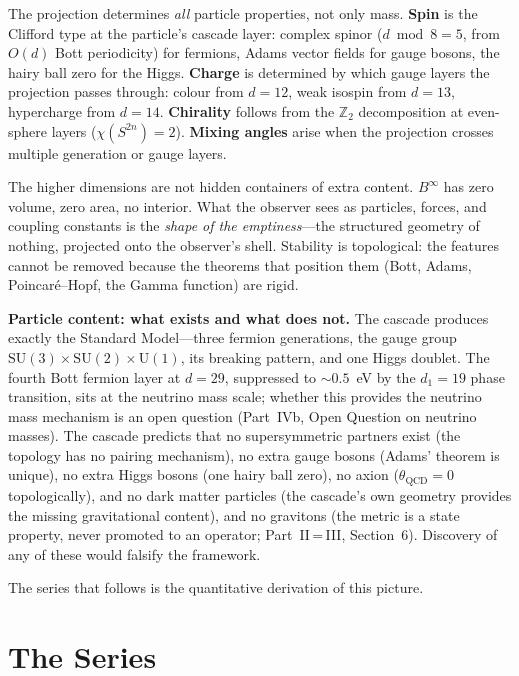 \documentclass[12pt,a4paper]{article}
\begin{document}
The projection determines \emph{all} particle properties, not only mass.
\textbf{Spin} is the Clifford type at the particle's cascade layer: complex
spinor ($d\bmod 8=5$, from $O(d)$ Bott periodicity) for fermions, Adams vector fields for gauge
bosons, the hairy ball zero for the Higgs. \textbf{Charge} is determined by
which gauge layers the projection passes through: colour from $d=12$, weak
isospin from $d=13$, hypercharge from $d=14$. \textbf{Chirality} follows from
the $\mathbb{Z}_2$ decomposition at even-sphere layers ($\chi(S^{2n})=2$).
\textbf{Mixing angles} arise when the projection crosses multiple generation
or gauge layers.

The higher dimensions are not hidden containers of extra content. $B^\infty$
has zero volume, zero area, no interior. What the observer sees as particles,
forces, and coupling constants is the \emph{shape of the emptiness}---the
structured geometry of nothing, projected onto the observer's shell. Stability
is topological: the features cannot be removed because the theorems that
position them (Bott, Adams, Poincar\'{e}--Hopf, the Gamma function) are rigid.

\textbf{Particle content: what exists and what does not.} The cascade produces
exactly the Standard Model---three fermion generations, the gauge group
$\mathrm{SU}(3)\times\mathrm{SU}(2)\times\mathrm{U}(1)$, its breaking
pattern, and one Higgs doublet. The fourth Bott fermion layer at $d=29$,
suppressed to $\sim 0.5$~eV by the $d_1=19$ phase transition, sits at the
neutrino mass scale; whether this provides the neutrino mass mechanism is
an open question (Part~IVb, Open Question on neutrino masses). The cascade predicts that
no supersymmetric partners exist (the topology has no pairing mechanism), no
extra gauge bosons (Adams' theorem is unique), no extra Higgs bosons (one
hairy ball zero), no axion ($\theta_{\mathrm{QCD}}=0$ topologically), and no
dark matter particles (the cascade's own geometry provides the missing
gravitational content), and no gravitons (the metric is a state property,
never promoted to an operator; Part~II\,=\,III, Section~6). Discovery of
any of these would falsify the framework.

The series that follows is the quantitative derivation of this picture.



\bigskip

\section*{The Series}
\end{document}
